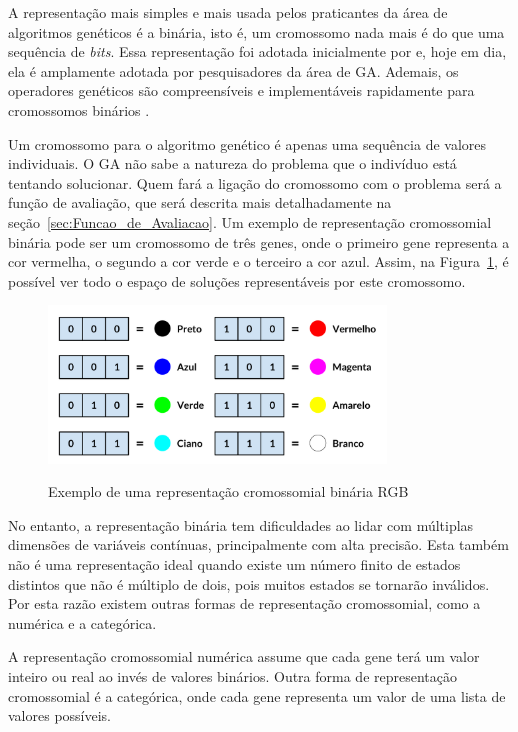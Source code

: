 \documentclass[12pt,oneside,a4paper,english,french,spanish,brazil,]{abntex2}
\begin{document}
A representação mais simples e mais usada pelos praticantes da área de algoritmos genéticos é a binária, isto é, um cromossomo nada mais é do que uma sequência de \textit{bits}. Essa representação foi adotada inicialmente por \citet{holland:1992} e, hoje em dia, ela é amplamente adotada por pesquisadores da área de GA. Ademais, os operadores genéticos são compreensíveis e implementáveis rapidamente para cromossomos binários \cite{linden:2008}.

Um cromossomo para o algoritmo genético é apenas uma sequência de valores individuais. O GA não sabe a natureza do problema que o indivíduo está tentando solucionar. Quem fará a ligação do cromossomo com o problema será a função de avaliação, que será descrita mais detalhadamente na seção~\ref{sec:Funcao_de_Avaliacao}. Um exemplo de representação cromossomial binária pode ser um cromossomo de três genes, onde o primeiro gene representa a cor vermelha, o segundo a cor verde e o terceiro a cor azul. Assim, na Figura~\ref{fig:GA_Cromossomo_RGB}, é possível ver todo o espaço de soluções representáveis por este cromossomo.

\begin{figure}[ht]
\centering
\caption{Exemplo de uma representação cromossomial binária RGB}
\includegraphics[width=0.8\textwidth]{imagens/GA_Cromossomo_RGB.pdf}
\sourceAuthor	
\label{fig:GA_Cromossomo_RGB}
\end{figure}

No entanto, a representação binária tem dificuldades ao lidar com múltiplas dimensões de variáveis contínuas, principalmente com alta precisão. Esta também não é uma representação ideal quando existe um número finito de estados distintos que não é múltiplo de dois, pois muitos estados se tornarão inválidos. Por esta razão existem outras formas de representação cromossomial, como a numérica e a categórica.

A representação cromossomial numérica assume que cada gene terá um valor inteiro ou real ao invés de valores binários. Outra forma de representação cromossomial é a categórica, onde cada gene representa um valor de uma lista de valores possíveis.
\end{document}
